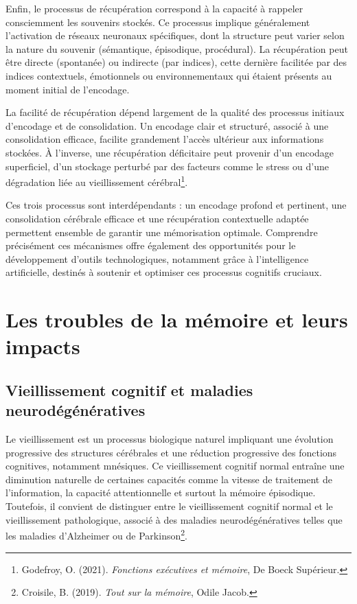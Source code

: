 \documentclass[11pt,a4paper]{report}
\begin{document}
Enfin, le processus de récupération correspond à la capacité à rappeler consciemment les souvenirs stockés. Ce processus implique généralement l'activation de réseaux neuronaux spécifiques, dont la structure peut varier selon la nature du souvenir (sémantique, épisodique, procédural). La récupération peut être directe (spontanée) ou indirecte (par indices), cette dernière facilitée par des indices contextuels, émotionnels ou environnementaux qui étaient présents au moment initial de l'encodage.

La facilité de récupération dépend largement de la qualité des processus initiaux d'encodage et de consolidation. Un encodage clair et structuré, associé à une consolidation efficace, facilite grandement l'accès ultérieur aux informations stockées. À l’inverse, une récupération déficitaire peut provenir d’un encodage superficiel, d’un stockage perturbé par des facteurs comme le stress ou d'une dégradation liée au vieillissement cérébral\footnote{Godefroy, O. (2021). \textit{Fonctions exécutives et mémoire}, De Boeck Supérieur.}.

Ces trois processus sont interdépendants : un encodage profond et pertinent, une consolidation cérébrale efficace et une récupération contextuelle adaptée permettent ensemble de garantir une mémorisation optimale. Comprendre précisément ces mécanismes offre également des opportunités pour le développement d'outils technologiques, notamment grâce à l’intelligence artificielle, destinés à soutenir et optimiser ces processus cognitifs cruciaux.

\section{Les troubles de la mémoire et leurs impacts}

\subsection{Vieillissement cognitif et maladies neurodégénératives}

Le vieillissement est un processus biologique naturel impliquant une évolution progressive des structures cérébrales et une réduction progressive des fonctions cognitives, notamment mnésiques. Ce vieillissement cognitif normal entraîne une diminution naturelle de certaines capacités comme la vitesse de traitement de l'information, la capacité attentionnelle et surtout la mémoire épisodique. Toutefois, il convient de distinguer entre le vieillissement cognitif normal et le vieillissement pathologique, associé à des maladies neurodégénératives telles que les maladies d’Alzheimer ou de Parkinson\footnote{Croisile, B. (2019). \textit{Tout sur la mémoire}, Odile Jacob.}.
\end{document}
